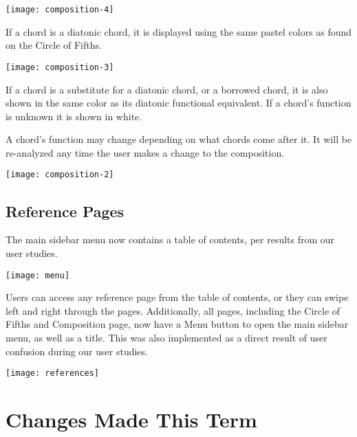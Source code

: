 \documentclass[onecolumn, draftclsnofoot,10pt, compsoc]{IEEEtran}
\begin{document}
\begin{center}
\texttt{[image: composition-4]}
\end{center}

If a chord is a diatonic chord, it is displayed using the same pastel colors as found on the Circle of Fifths.

\begin{center}
\texttt{[image: composition-3]}
\end{center}

If a chord is a substitute for a diatonic chord, or a borrowed chord, it is also shown in the same color as its diatonic functional equivalent.
If a chord's function is unknown it is shown in white.

A chord's function may change depending on what chords come after it.
It will be re-analyzed any time the user makes a change to the composition.

\begin{center}
\texttt{[image: composition-2]}
\end{center}

\subsection{Reference Pages}

The main sidebar menu now contains a table of contents, per results from our user studies.

\begin{center}
\texttt{[image: menu]}
\end{center}

Users can access any reference page from the table of contents, or they can swipe left and right through the pages.
Additionally, all pages, including the Circle of Fifths and Composition page, now have a Menu button to open the main sidebar menu, as well as a title.
This was also implemented as a direct result of user confusion during our user studies.

\begin{center}
\texttt{[image: references]}
\end{center}

\section{Changes Made This Term}
\end{document}
